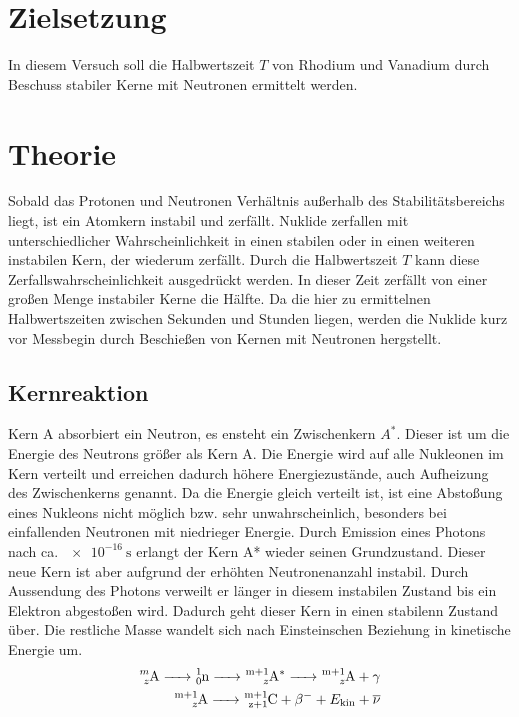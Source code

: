\section{Zielsetzung}
In diesem Versuch soll die Halbwertszeit $T$ von Rhodium und Vanadium durch Beschuss stabiler Kerne mit Neutronen ermittelt werden.

\section{Theorie}
\label{sec:Theorie}
Sobald das Protonen und Neutronen Verhältnis außerhalb des Stabilitätsbereichs liegt, ist ein Atomkern instabil und zerfällt.
Nuklide zerfallen mit unterschiedlicher Wahrscheinlichkeit in einen stabilen oder in einen weiteren instabilen Kern, der wiederum zerfällt.
Durch die Halbwertszeit $T$ kann diese Zerfallswahrscheinlichkeit ausgedrückt werden.
In dieser Zeit zerfällt von einer großen Menge instabiler Kerne die Hälfte.
Da die hier zu ermittelnen Halbwertszeiten zwischen Sekunden und Stunden liegen, werden die Nuklide kurz vor Messbegin durch Beschießen von Kernen mit Neutronen hergstellt.

\subsection{Kernreaktion}
\label{subsec:Kernreaktion}
Kern A absorbiert ein Neutron, es ensteht ein Zwischenkern $A^*$.
Dieser ist um die Energie des Neutrons größer als Kern A.
Die Energie wird auf alle Nukleonen im Kern verteilt und erreichen dadurch höhere Energiezustände, auch Aufheizung des Zwischenkerns genannt.
Da die Energie gleich verteilt ist, ist eine Abstoßung eines Nukleons nicht möglich bzw. sehr unwahrscheinlich, besonders bei einfallenden Neutronen mit niedrieger Energie.
Durch Emission eines Photons nach ca. $\SI{e-16}{\second}$ erlangt der Kern A* wieder seinen Grundzustand.
Dieser neue Kern ist aber aufgrund der erhöhten Neutronenanzahl instabil.
Durch Aussendung des Photons verweilt er länger in diesem instabilen Zustand bis ein Elektron abgestoßen wird.
Dadurch geht dieser Kern in einen stabilenn Zustand über.
Die restliche Masse wandelt sich nach Einsteinschen Beziehung in kinetische Energie um.
\begin{align*}
    \ce{^{m}_{z}A -> ^{1}_0n -> ^{m{+1}}_{z}{A^{*}} -> ^{m{+1}}_{z}A} + \gamma\\
    \ce{^{m{+1}}_{z}A -> ^{m{+1}}_{z{+1}}C }+ \beta ^{-} + E_{\text{kin}} + \overline{\nu}
\end{align*}

